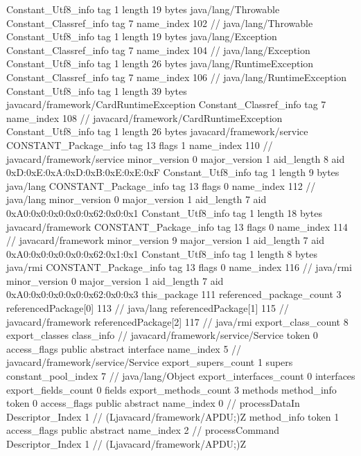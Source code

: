 {{{		}
		Constant_Utf8_info {
			tag	1
			length	19
			bytes	java/lang/Throwable
		}
		Constant_Classref_info {
			tag	7
			name_index	102		// java/lang/Throwable
		}
		Constant_Utf8_info {
			tag	1
			length	19
			bytes	java/lang/Exception
		}
		Constant_Classref_info {
			tag	7
			name_index	104		// java/lang/Exception
		}
		Constant_Utf8_info {
			tag	1
			length	26
			bytes	java/lang/RuntimeException
		}
		Constant_Classref_info {
			tag	7
			name_index	106		// java/lang/RuntimeException
		}
		Constant_Utf8_info {
			tag	1
			length	39
			bytes	javacard/framework/CardRuntimeException
		}
		Constant_Classref_info {
			tag	7
			name_index	108		// javacard/framework/CardRuntimeException
		}
		Constant_Utf8_info {
			tag	1
			length	26
			bytes	javacard/framework/service
		}
		CONSTANT_Package_info {
			tag	13
			flags	1
			name_index	110		// javacard/framework/service
			minor_version	0
			major_version	1
			aid_length	8
			aid	0xD:0xE:0xA:0xD:0xB:0xE:0xE:0xF
		}
		Constant_Utf8_info {
			tag	1
			length	9
			bytes	java/lang
		}
		CONSTANT_Package_info {
			tag	13
			flags	0
			name_index	112		// java/lang
			minor_version	0
			major_version	1
			aid_length	7
			aid	0xA0:0x0:0x0:0x0:0x62:0x0:0x1
		}
		Constant_Utf8_info {
			tag	1
			length	18
			bytes	javacard/framework
		}
		CONSTANT_Package_info {
			tag	13
			flags	0
			name_index	114		// javacard/framework
			minor_version	9
			major_version	1
			aid_length	7
			aid	0xA0:0x0:0x0:0x0:0x62:0x1:0x1
		}
		Constant_Utf8_info {
			tag	1
			length	8
			bytes	java/rmi
		}
		CONSTANT_Package_info {
			tag	13
			flags	0
			name_index	116		// java/rmi
			minor_version	0
			major_version	1
			aid_length	7
			aid	0xA0:0x0:0x0:0x0:0x62:0x0:0x3
		}
	}
	this_package	111
	referenced_package_count	3
	referencedPackage[0]	113		// java/lang
	referencedPackage[1]	115		// javacard/framework
	referencedPackage[2]	117		// java/rmi
	export_class_count	8
	export_classes {
		class_info {		// javacard/framework/service/Service
			token	0
			access_flags	public abstract interface
			name_index	5		// javacard/framework/service/Service
			export_supers_count	1
			supers {
				constant_pool_index	7		// java/lang/Object
			}
			export_interfaces_count	0
			interfaces {
			}
			export_fields_count	0
			fields {
			}
			export_methods_count	3
			methods {
				method_info {
					token	0
					access_flags	public abstract
					name_index	0		// processDataIn
					Descriptor_Index	1		// (Ljavacard/framework/APDU;)Z
				}
				method_info {
					token	1
					access_flags	public abstract
					name_index	2		// processCommand
					Descriptor_Index	1		// (Ljavacard/framework/APDU;)Z
}}}}}
